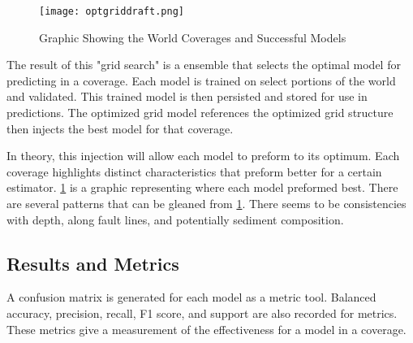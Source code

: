 \begin{figure}[h]
    \centering
    \texttt{[image: optgriddraft.png]}
    \caption{Graphic Showing the World Coverages and Successful Models}
    \label{fig:coveragegrid}
\end{figure}
\par
The result of this "grid search" is a ensemble that selects the optimal model for predicting in a coverage.
Each model is trained on select portions of the world and validated.
This trained model is then persisted and stored for use in predictions.
The optimized grid model references the optimized grid structure then injects the best model for that coverage.

\par
In theory, this injection will allow each model to preform to its optimum.
Each coverage highlights distinct characteristics that preform better for a certain estimator.
\ref{fig:coveragegrid} is a graphic representing where each model preformed best.
There are several patterns that can be gleaned from \ref{fig:coveragegrid}. 
There seems to be consistencies with depth, along fault lines, and potentially sediment composition. 


\subsection{Results and Metrics}


\par
A confusion matrix is generated for each model as a metric tool.
Balanced accuracy, precision, recall, F1 score, and support are also recorded for metrics.
These metrics give a measurement of the effectiveness for a model in a coverage.

